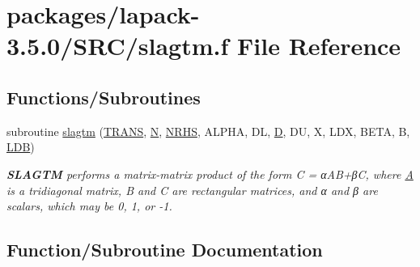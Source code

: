 \hypertarget{slagtm_8f}{}\section{packages/lapack-\/3.5.0/\+S\+R\+C/slagtm.f File Reference}
\label{slagtm_8f}
\subsection*{Functions/\+Subroutines}
\begin{DoxyCompactItemize}
\item 
subroutine \hyperlink{slagtm_8f_aec2b968f572c547931dff550f5419b5e}{slagtm} (\hyperlink{superlu__enum__consts_8h_a0c4e17b2d5cea33f9991ccc6a6678d62a1f61e3015bfe0f0c2c3fda4c5a0cdf58}{T\+R\+A\+N\+S}, \hyperlink{polmisc_8c_a0240ac851181b84ac374872dc5434ee4}{N}, \hyperlink{example__user_8c_aa0138da002ce2a90360df2f521eb3198}{N\+R\+H\+S}, A\+L\+P\+H\+A, D\+L, \hyperlink{odrpack_8h_a7dae6ea403d00f3687f24a874e67d139}{D}, D\+U, X, L\+D\+X, B\+E\+T\+A, B, \hyperlink{example__user_8c_a50e90a7104df172b5a89a06c47fcca04}{L\+D\+B})
\begin{DoxyCompactList}\small\item\em {\bfseries S\+L\+A\+G\+T\+M} performs a matrix-\/matrix product of the form C = α\+A\+B+β\+C, where \hyperlink{classA}{A} is a tridiagonal matrix, B and C are rectangular matrices, and α and β are scalars, which may be 0, 1, or -\/1. \end{DoxyCompactList}\end{DoxyCompactItemize}


\subsection{Function/\+Subroutine Documentation}
\hypertarget{slagtm_8f_aec2b968f572c547931dff550f5419b5e}{}
